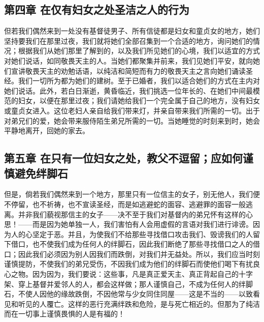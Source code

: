 
\subsection{第四章 在仅有妇女之处圣洁之人的行为}

但若我们偶然来到一处没有基督徒男子、所有信徒都是妇女和童贞女的地方，她们坚持要我们在那里过夜，我们就将她们全部召集到一个合适的地方，询问她们的情况；根据我们从她们那里了解到的，以及我们所见她们的心境，我们以适宜的方式对她们说话，如同敬畏天主的人。当她们都聚集并前来，我们见她们平安，就向她们宣讲敬畏天主的劝勉话语，以纯洁和简短而有力的敬畏天主之言向她们诵读圣经。我们一切所为都为她们的建树。至于已婚者，我们以适合她们的方式在主内对她们说话。此外，若白日渐逝，黄昏临近，我们挑选一位年长的、在她们中间最模范的妇女，以便在那里过夜；我们请她给我们一个完全属于自己的地方，没有妇女或童贞女进入。这位老妇人亲自给我们带来灯，并亲自带来我们所需的一切。出于对弟兄们的爱，她会带来服侍陌生弟兄所需的一切。当她睡觉的时刻来到时，她会平静地离开，回她的家去。\par


\subsection{第五章 在只有一位妇女之处，教父不逗留；应如何谨慎避免绊脚石}

但是，倘若我们偶然来到一个地方，那里只有一位信主的女子，别无他人，我们便不停留，也不祈祷，也不宣读圣经，而是如逃避蛇的面容、逃避罪的面容一般逃离。并非我们藐视那信主的女子——决不至于我们对基督内的弟兄怀有这样的心思！——而是因为她单独一人，我们害怕有人会用虚假的言语对我们进行诽谤。因为人的心坚定于恶。并且，为使我们不给那些寻找借口攻击我们、毁谤我们的人留下借口，也不使我们成为任何人的绊脚石，因此我们断绝了那些寻找借口之人的借口；因此我们必须因为别人因我们而跌倒，对我们并无益处。所以，我们应当时刻谨慎提防，不使我们的弟兄受伤，不因我们成为他们的绊脚石而使他们喝下有扰良心之物。因为因为，我们要说：这些事，凡是真正爱天主、真正背起自己的十字架、穿上基督并爱邻人的人，都会这样做；那人谨慎自己，不成为任何人的绊脚石，不使人因他的缘故跌倒，不因他常与少女同住同屋——这是不当的——以致看见和听见的人覆亡。这样的恶行充满绊跌和危险，是与死亡相近的。但那为了纯洁而在一切事上谨慎畏惧的人是有福的！\par

